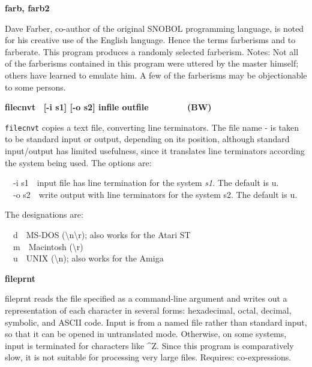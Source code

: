 {{\sffamily\bfseries
farb, farb2\ \ \ \ \ \ \ \ \ \ \ \ \ \ \ \ \ \ \ \ }

Dave Farber, co-author of the original SNOBOL
programming language, is noted for his creative use of the English
language. Hence the terms {\textquotedbl}farberisms{\textquotedbl} and
{\textquotedbl}to farberate{\textquotedbl}. This program produces a
randomly selected farberism. Notes: Not all of the farberisms contained
in this program were uttered by the master himself; others have learned
to emulate him. A few of the farberisms may be objectionable to some
persons.

{\sffamily\bfseries
filecnvt \ \textrm{\textmd{[-i s1] [-o s2] infile
outfile\ \ \ \ \ \ \ \  }}(BW)}

\texttt{filecnvt} copies a text file, converting line terminators. The
file name {\textquotedbl}-{\textquotedbl} is taken to be standard input
or output, depending on its position, although standard input/output
has limited usefulness, since it translates line terminators according
the system being used. The options are:

\textsf{\ \ {}-i s1}\ \ input file has line termination for the system
\textsf{\textit{s1}}. The default is
{\textquotedbl}u{\textquotedbl}.\\
\ \ \textsf{{}-o s2}\ \ write output with line terminators for the
system s2. The default is {\textquotedbl}u{\textquotedbl}.

The designations are:

\ \ d\ \ MS-DOS
({\textquotedbl}{\textbackslash}n{\textbackslash}r{\textquotedbl});
also works for the Atari ST\\
\ \ m\ \ Macintosh
({\textquotedbl}{\textbackslash}r{\textquotedbl})\\
\ \ u\ \ UNIX ({\textquotedbl}{\textbackslash}n{\textquotedbl}); also
works for the Amiga

{\sffamily\bfseries
fileprnt\ \ \ \ \ \ \ \ \ \ \ \ \ \ \ \ \ \ \ \ }

\textsf{fileprnt} reads the file specified as a command-line argument
and writes out a representation of each character in several forms:
hexadecimal, octal, decimal, symbolic, and ASCII code.
Input is from a named file rather than standard input, so that it can
be opened in untranslated mode. Otherwise, on some systems, input is
terminated for characters like \^{}Z. Since this program is
comparatively slow, it is not suitable for processing very large files.
Requires: co-expressions.

}
